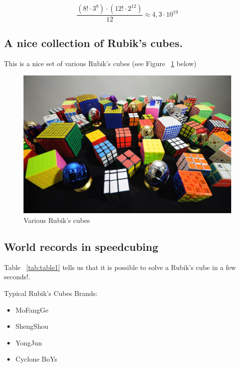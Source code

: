 \begin{equation}
\frac{(8!\cdot3^8)\cdot(12!\cdot2^{12})}{12}  \approx 4,3 \cdot 10^{19}
\end{equation}

\subsection{A nice collection of Rubik's cubes.}
This is a nice set of various Rubik's cubes (see Figure ~\ref{fig:cubes} below)
\vspace{0,5cm}
\begin{figure}[htbp]
\centering
\includegraphics[scale=0.25]{pictures/rubiks.jpg}
\vspace{0,5cm}
\caption{Various Rubik's cubes}
\label{fig:cubes}
\end{figure}
\hspace{3cm}

\subsection{World records in speedcubing}
\vspace{0,5cm}


\vspace{0,5cm}
Table ~\ref{tab:table1} tells us that it is possible to solve a Rubik's cube in a few seconds!.
\vspace{0,5cm}

Typical Rubik's Cubes Brands:
\begin{itemize}
    \item MoFangGe
    \item  ShengShou
     \item YongJun
     \item Cyclone BoYs
\end{itemize}
